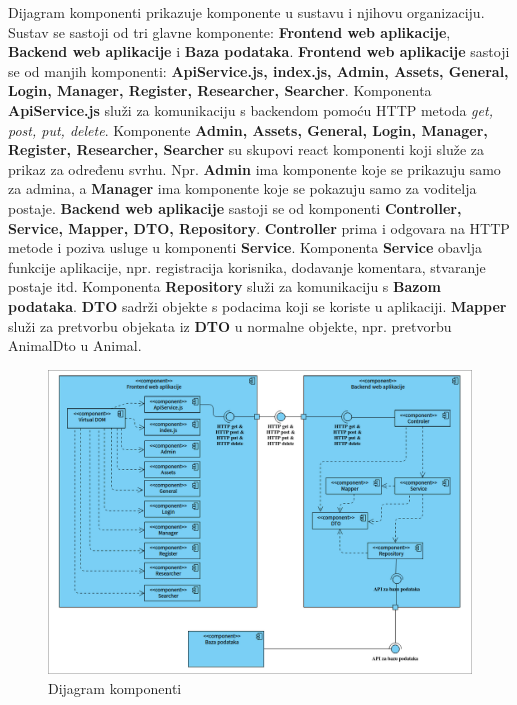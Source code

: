 			 Dijagram komponenti prikazuje komponente u sustavu i njihovu organizaciju. Sustav se sastoji od tri glavne komponente: \textbf{Frontend web aplikacije}, \textbf{Backend web aplikacije} i \textbf{Baza podataka}. \textbf{Frontend web aplikacije} sastoji se od manjih komponenti: \textbf{ApiService.js, index.js, Admin, Assets, General, Login, Manager, Register, Researcher, Searcher}. Komponenta \textbf{ApiService.js} služi za komunikaciju s backendom pomoću HTTP metoda \textit{get, post, put, delete}. Komponente \textbf{Admin, Assets, General, Login, Manager, Register, Researcher, Searcher} su skupovi react komponenti koji služe za prikaz za određenu svrhu. Npr. \textbf{Admin} ima komponente koje se prikazuju samo za admina, a \textbf{Manager} ima komponente koje se pokazuju samo za voditelja postaje. \textbf{Backend web aplikacije} sastoji se od komponenti \textbf{Controller, Service, Mapper, DTO, Repository}. \textbf{Controller} prima i odgovara na HTTP metode i poziva usluge u komponenti \textbf{Service}. Komponenta \textbf{Service} obavlja funkcije aplikacije, npr. registracija korisnika, dodavanje komentara, stvaranje postaje itd. Komponenta \textbf{Repository} služi za komunikaciju s \textbf{Bazom podataka}. \textbf{DTO} sadrži objekte s podacima koji se koriste u aplikaciji. \textbf{Mapper} služi za pretvorbu objekata iz \textbf{DTO} u normalne objekte, npr. pretvorbu AnimalDto u Animal.
			 
			 
			 \begin{figure}[H]
			 	\includegraphics[scale=0.45]{dijagrami/dijagram_komponenti2.png}
			 	\centering
			 	\caption{Dijagram komponenti}
			 	\label{fig:promjene}
			 \end{figure}